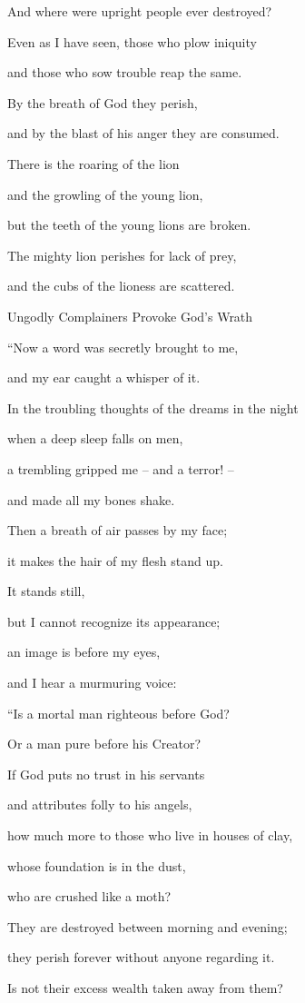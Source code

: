 {\par }{\Q And where
were upright
people ever destroyed?
\par }{\Q {}Even as
I have seen,
those who plow
iniquity
\par }{\Q and those who sow
trouble
reap the same.
\par }{\Q {}By the breath
of God
they perish,
\par }{\Q and by the blast
of his anger
they are consumed.
\par }{\Q {}There is the roaring
of the lion
\par }{\Q and the growling
of the young lion,
\par }{\Q but the teeth
of the young lions
are broken.
\par }{\Q {}The mighty lion
perishes
for lack
of prey,
\par }{\Q and the cubs
of the lioness
are scattered.
\par }{\SH Ungodly Complainers Provoke God’s Wrath
\par }{\Q {}“Now a word
was secretly
brought
to me,
\par }{\Q and my ear
caught a whisper of it.
\par }{\Q {}In the troubling thoughts
of the dreams
in the night
\par }{\Q when a deep sleep
falls
on
men,
\par }{\Q {}a trembling
gripped me – and a terror! –
\par }{\Q and made all my bones shake.
\par }{\Q {}Then a breath
of air passes
by my face;
\par }{\Q it makes
the hair
of my flesh stand up.
\par }{\Q {}It stands
still,

\par }{\Q but I cannot recognize
its appearance;
\par }{\Q an image
is before
my eyes,
\par }{\Q and I hear
a murmuring
voice:
\par }{\Q {}“Is a mortal man
righteous
before God?
\par }{\Q Or
a man pure before his Creator?
\par }{\Q {}If
God puts no
trust
in his servants
\par }{\Q and attributes
folly
to his angels,
\par }{\Q {}how much
more to those who live
in houses
of clay,
\par }{\Q whose
foundation
is in the dust,
\par }{\Q who are crushed
like a moth?
\par }{\Q {}They are destroyed
between morning
and evening;
\par }{\Q they perish
forever
without
anyone regarding it.
\par }{\Q {}Is not
their excess
wealth taken away from
them?

}
